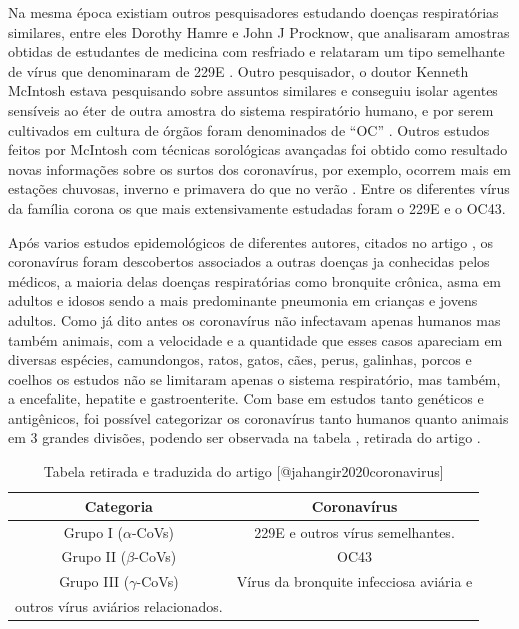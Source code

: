 \documentclass[
  fleqn,ebook]{ic}
\begin{document}
Na mesma época existiam outros pesquisadores estudando doenças respiratórias
similares, entre eles Dorothy Hamre e John J Procknow, que analisaram amostras
obtidas de estudantes de medicina com resfriado e relataram um tipo semelhante
de vírus que denominaram de 229E \citep{hamre1966new}. Outro pesquisador, o doutor
Kenneth McIntosh estava pesquisando sobre assuntos similares e conseguiu isolar
agentes sensíveis ao éter de outra amostra do sistema respiratório humano, e por
serem cultivados em cultura de órgãos foram denominados de ``OC''
\citep{mcintosh1967recovery}. Outros estudos feitos por McIntosh com técnicas
sorológicas avançadas foi obtido como resultado novas informações sobre os
surtos dos coronavírus, por exemplo, ocorrem mais em estações chuvosas, inverno
e primavera do que no verão \citep{mcintosh1970seroepidemiologic}. Entre os
diferentes vírus da família corona os que mais extensivamente estudadas foram
o 229E e o OC43.

Após varios estudos epidemológicos de diferentes autores, citados no artigo
\citep{jahangir2020coronavirus}, os coronavírus foram descobertos associados a
outras doenças ja conhecidas pelos médicos, a maioria delas doenças
respiratórias como bronquite crônica, asma em adultos e idosos sendo a mais
predominante pneumonia em crianças e jovens adultos. Como já dito antes os
coronavírus não infectavam apenas humanos mas também animais, com a velocidade
e a quantidade que esses casos apareciam em diversas espécies, camundongos,
ratos, gatos, cães, perus, galinhas, porcos e coelhos os estudos não se
limitaram apenas o sistema respiratório, mas também, a encefalite, hepatite e
gastroenterite. Com base em estudos tanto genéticos e antigênicos, foi possível
categorizar os coronavírus tanto humanos quanto animais em 3 grandes divisões,
podendo ser observada na tabela \citep{tab:corona3div}, retirada do artigo
\citep{jahangir2020coronavirus}.

\begin{table}[H]
    \centering
    \begin{tabular}{|c|c|}
        \hline
        \textbf{Categoria} & \textbf{Coronavírus}\\ \hline
        Grupo I ($\alpha$-CoVs) & 229E e outros vírus semelhantes. \\ \hline
        Grupo II ($\beta$-CoVs) & OC43 \\ \hline
        Grupo III ($\gamma$-CoVs) & Vírus da bronquite infecciosa aviária e\\ outros vírus aviários relacionados. \\
        \hline
    \end{tabular}
    \caption{Tabela retirada e traduzida do artigo [@jahangir2020coronavirus]}
    \label{tab:corona3div}
\end{table}
\end{document}
